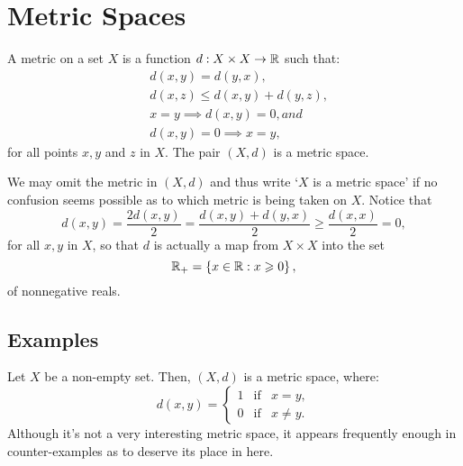 \section{Metric Spaces}\label{sec:metric-spaces}

\begin{definition}
  A metric on a set \(X\) is a function \(d:X\times{X}\to\mathbb{R}\) such that:
  \begin{align}
      & d(x,y)=d(y,x),                  \label{axiom:metric-space-01} \\
      & d(x,z)\leqslant{d(x,y)+d(y,z)}, \label{axiom:metric-space-02} \\
      & x=y\implies{d(x,y)=0}, and      \label{axiom:metric-space-03} \\
      & d(x,y)=0\implies{x=y},          \label{axiom:metric-space-04}
  \end{align}
  for all points \(x,y\) and \(z\) in \(X\). The pair \((X,d)\) is a metric
  space.
\end{definition}

We may omit the metric in \((X,d)\) and thus write `\(X\) is a metric space' if
no confusion seems possible as to which metric is being taken on \(X\). Notice
that
\[
  d(x,y)
  =
  \frac{2d(x,y)}{2}
  =
  \frac{d(x,y)+d(y,x)}{2}
  \geqslant
  \frac{d(x,x)}{2}
  =
  0,
\]
for all \(x,y\) in \(X\), so that \(d\) is actually a map from \(X\times{X}\)
into the set
\[
  \mathbb{R}_{+}
  =
  \left\{x\in\mathbb{R}:x\geqslant{0}\right\},
\]
of nonnegative reals.

\subsection{Examples}

\begin{example}\label{example:the-0-1-metric}
  Let \(X\) be a non-empty set. Then, \((X,d)\) is a metric space, where:
  \begin{equation*}
    d(x,y)=
    \left\{
      \begin{array}{lll}
        1 & \text{if} & x=y, \\
        0 & \text{if} & x\neq{y}.
      \end{array}
    \right.
  \end{equation*}
  Although it's not a very interesting metric space, it appears frequently
  enough in counter-examples as to deserve its place in here.
\end{example}

